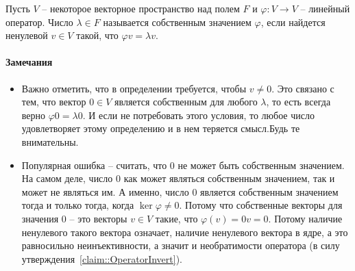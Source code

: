 \begin{definition}
Пусть $V$ -- некоторое векторное пространство над полем $F$ и $\varphi \colon V\to V$ -- линейный оператор.
Число $\lambda \in F$ называется собственным значением $\varphi$, если найдется ненулевой $v\in V$ такой, что $\varphi v = \lambda v$.
\end{definition}

\paragraph{Замечания}

\begin{itemize}
\item Важно отметить, что в определении требуется, чтобы $v\neq 0$.
Это связано с тем, что вектор $0\in V$ является собственным для любого $\lambda$, то есть всегда верно $\varphi 0 = \lambda 0$.
И если не потребовать этого условия, то любое число удовлетворяет этому определению и в нем теряется смысл.Будь те внимательны.

\item Популярная ошибка -- считать, что $0$ не может быть собственным значением.
На самом деле, число $0$ как может являться собственным значением, так и может не являться им.
А именно, число $0$ является собственным значением тогда и только тогда, когда $\ker \varphi \neq 0$.
Потому что собственные векторы для значения $0$ -- это векторы $v\in V$ такие, что $\varphi(v) = 0 v = 0$.
Потому наличие ненулевого такого вектора означает, наличие ненулевого вектора в ядре, а это равносильно неинъективности, а значит и необратимости оператора (в силу утверждения~\ref{claim::OperatorInvert}).
\end{itemize}


